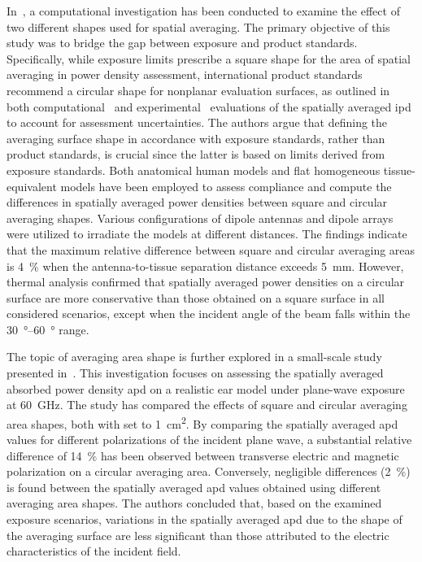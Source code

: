 In~\cite{Morimoto2022Assessment}, a computational investigation has been conducted to examine the effect of two different shapes used for spatial averaging.
The primary objective of this study was to bridge the gap between exposure and product standards.
Specifically, while exposure limits prescribe a square shape for the area of spatial averaging in power density assessment, international product standards recommend a circular shape for nonplanar evaluation surfaces, as outlined in both computational~\cite{IEC63195-2-2022} and experimental~\cite{IEC63195-1-2022} evaluations of the spatially averaged \gls{ipd} to account for assessment uncertainties.
The authors argue that defining the averaging surface shape in accordance with exposure standards, rather than product standards, is crucial since the latter is based on limits derived from exposure standards.
Both anatomical human models and flat homogeneous tissue-equivalent models have been employed to assess compliance and compute the differences in spatially averaged power densities between square and circular averaging shapes.
Various configurations of dipole antennas and dipole arrays were utilized to irradiate the models at different distances.
The findings indicate that the maximum relative difference between square and circular averaging areas is \SI{4}{\percent} when the antenna-to-tissue separation distance exceeds \SI{5}{\mm}.
However, thermal analysis confirmed that spatially averaged power densities on a circular surface are more conservative than those obtained on a square surface in all considered scenarios, except when the incident angle of the beam falls within the \SIrange{30}{60}{\degree} range.

The topic of averaging area shape is further explored in a small-scale study presented in~\cite{Kapetanovic2022IMBioc}.
This investigation focuses on assessing the spatially averaged absorbed power density \gls{apd} on a realistic ear model under plane-wave exposure at \SI{60}{\GHz}.
The study has compared the effects of square and circular averaging area shapes, both with set to \SI{1}{\cm\squared}.
By comparing the spatially averaged \gls{apd} values for different polarizations of the incident plane wave, a substantial relative difference of \SI{14}{\percent} has been observed between transverse electric and magnetic polarization on a circular averaging area.
Conversely, negligible differences (\SI{2}{\percent}) is found between the spatially averaged \gls{apd} values obtained using different averaging area shapes.
The authors concluded that, based on the examined exposure scenarios, variations in the spatially averaged \gls{apd} due to the shape of the averaging surface are less significant than those attributed to the electric characteristics of the incident field.
